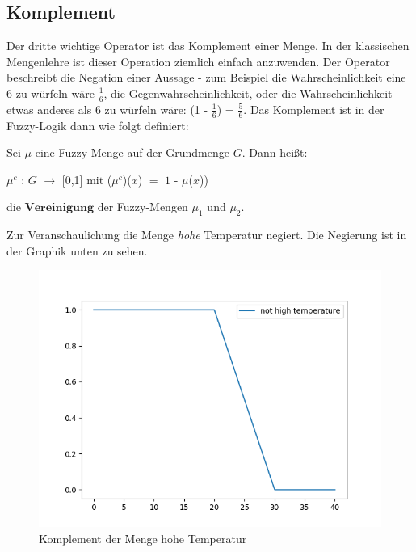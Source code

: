 \subsection{Komplement}

Der dritte wichtige Operator ist das Komplement einer Menge. In der klassischen Mengenlehre ist dieser Operation ziemlich einfach anzuwenden. Der Operator beschreibt die Negation einer Aussage - zum Beispiel die Wahrscheinlichkeit eine 6 zu würfeln wäre $\frac{1}{6}$, die Gegenwahrscheinlichkeit, oder die Wahrscheinlichkeit etwas anderes als 6 zu würfeln wäre: (1 - $\frac{1}{6}$) = $\frac{5}{6}$. Das Komplement ist in der Fuzzy-Logik dann wie folgt definiert: 

\begin{definition}
	Sei $\mu$ eine Fuzzy-Menge auf der Grundmenge $G$. Dann heißt:
	\begin{center}
		$\mu^c$  : $G$ $\rightarrow$ [0,1] $\text{mit}$  ($\mu^c$)($x$) $=$ $1$ - $\mu$($x$)) 
	\end{center}
	die $\textbf{Vereinigung}$ der Fuzzy-Mengen $\mu_1$ und $\mu_2$.
\end{definition}

Zur Veranschaulichung die Menge \textit{hohe} Temperatur negiert. Die Negierung ist in der Graphik unten zu sehen.


\begin{figure}[htbp]\label{not_high_temp}
	\centering
	\includegraphics[scale=0.5]{images/not_high_temp.png}
	\caption{Komplement der Menge hohe Temperatur}
\end{figure}

